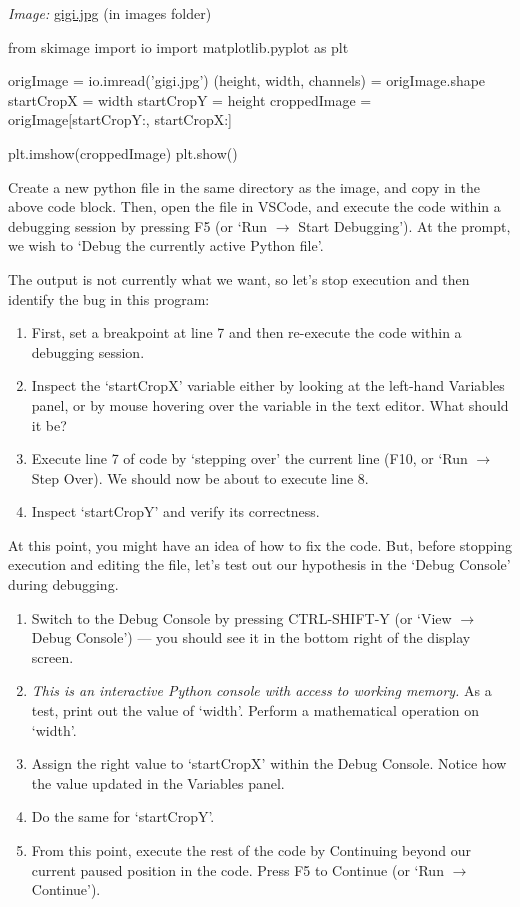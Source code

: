 \documentclass[11pt]{article}
\begin{document}
\emph{Image:} \href{images/gigi.jpg}{gigi.jpg} (in images folder)

\begin{python}
from skimage import io
import matplotlib.pyplot as plt

origImage = io.imread('gigi.jpg')
(height, width, channels) = origImage.shape
startCropX = width %
startCropY = height %
croppedImage = origImage[startCropY:, startCropX:]

plt.imshow(croppedImage)
plt.show()
\end{python}

\begin{tcolorbox}[colback=orange!5!white,colframe=orange!75!black,enhanced jigsaw,breakable,pad at break*=1mm]
Create a new python file in the same directory as the image, and copy in the above code block. Then, open the file in VSCode, and execute the code within a debugging session by pressing F5 (or `Run $\rightarrow$ Start Debugging'). At the prompt, we wish to `Debug the currently active Python file'.

The output is not currently what we want, so let's stop execution and then identify the bug in this program:
\begin{enumerate}
    \item First, set a breakpoint at line 7 and then re-execute the code within a debugging session.
    \item Inspect the `startCropX' variable either by looking at the left-hand Variables panel, or by mouse hovering over the variable in the text editor. What should it be?
    \item Execute line 7 of code by `stepping over' the current line (F10, or `Run $\rightarrow$ Step Over). We should now be about to execute line 8.
    \item Inspect `startCropY' and verify its correctness.
\end{enumerate}

At this point, you might have an idea of how to fix the code. But, before stopping execution and editing the file, let's test out our hypothesis in the `Debug Console' during debugging.

\begin{enumerate}
    \item Switch to the Debug Console by pressing CTRL-SHIFT-Y (or `View $\rightarrow$ Debug Console') --- you should see it in the bottom right of the display screen.
    \item \emph{This is an interactive Python console with access to working memory.} As a test, print out the value of `width'. Perform a mathematical operation on `width'.
    \item Assign the right value to `startCropX' within the Debug Console. Notice how the value updated in the Variables panel.
    \item Do the same for `startCropY'.
    \item From this point, execute the rest of the code by Continuing beyond our current paused position in the code. Press F5 to Continue (or `Run $\rightarrow$ Continue').
\end{enumerate}


\end{tcolorbox}
\end{document}
